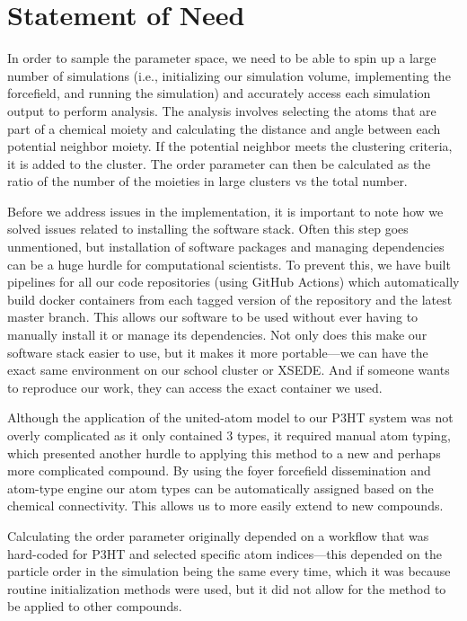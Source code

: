 \section{Statement of Need}
In order to sample the parameter space, we need to be able to spin up a large number of simulations (i.e., initializing our simulation volume, implementing the forcefield, and running the simulation) and accurately access each simulation output to perform analysis.
The analysis involves selecting the atoms that are part of a chemical moiety and calculating the distance and angle between each potential neighbor moiety. 
If the potential neighbor meets the clustering criteria, it is added to the cluster.
The order parameter can then be calculated as the ratio of the number of the moieties in large clusters vs the total number.

Before we address issues in the implementation, it is important to note how we solved issues related to installing the software stack.
Often this step goes unmentioned, but installation of software packages and managing dependencies can be a huge hurdle for computational scientists. 
To prevent this, we have built pipelines for all our code repositories (using GitHub Actions) which automatically build docker containers from each tagged version of the repository and the latest master branch. 
This allows our software to be used without ever having to manually install it or manage its dependencies. 
Not only does this make our software stack easier to use, but it makes it more portable---we can have the exact same environment on our school cluster or XSEDE. 
And if someone wants to reproduce our work, they can access the exact container we used.


Although the application of the united-atom model to our P3HT system was not overly complicated as it only contained 3 types, it required manual atom typing, which presented another hurdle to applying this method to a new and perhaps more complicated compound. 
By using the foyer forcefield dissemination and atom-type engine \cite{foyer} our atom types can be automatically assigned based on the chemical connectivity. This allows us to more easily extend to new compounds.

Calculating the order parameter originally depended on a workflow that was hard-coded for P3HT and selected specific atom indices---this depended on the particle order in the simulation being the same every time, which it was because routine initialization methods were used, but it did not allow for the method to be applied to other compounds.

